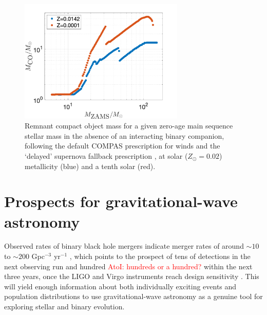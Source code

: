 \documentclass[iop,onecolumn]{revtex4}
\newcommand{\todo}[1]{\textcolor{red}{#1}}
\newcommand{\ajf}[1]{\textcolor{red}{AtoI: #1}}
\begin{document}
\begin{figure}
	\centering
	\includegraphics[width=0.7\textwidth]{BHremnantdelayed.png}
	\caption{\label{fig:BHremnant} Remnant compact object mass for a given zero-age main sequence stellar mass in the absence of an interacting binary companion, following the default COMPAS prescription for winds \citep{Stevenson:2017}  and the `delayed' supernova fallback prescription \citep{Fryer:2012}, at solar ($Z_\odot=0.02$) metallicity (blue) and a tenth solar (red).}
\end{figure}



\section{Prospects for gravitational-wave astronomy}\label{prospect}

Observed rates of binary black hole mergers indicate merger rates of around $\sim 10$ to $\sim 200$ Gpc$^{-3}$ yr$^{-1}$ \citep{GW150914:rates,GW170104}, which points to the prospect of tens of detections in the next observing run and hundred \ajf{hundreds or a hundred?} within the next three years, once the LIGO and Virgo instruments reach design sensitivity \citep{scenarios}.  This will yield enough information about both individually exciting events and population distributions to use gravitational-wave astronomy as a genuine tool for exploring stellar and binary evolution.  
\end{document}
